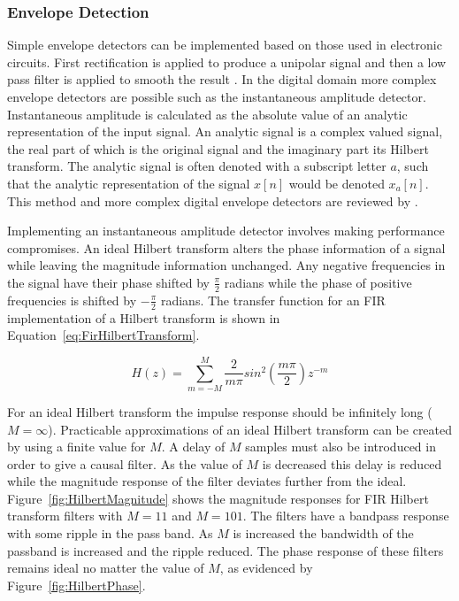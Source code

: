 		\subsubsection*{Envelope Detection}
			Simple envelope detectors can be implemented based on those used in electronic circuits. First
			rectification is applied to produce a unipolar signal and then a low pass filter is applied to
			smooth the result \citep{dutilleux2011modulators}. In the digital domain more complex envelope
			detectors are possible such as the instantaneous amplitude detector. Instantaneous amplitude is
			calculated as the absolute value of an analytic representation of the input signal. An analytic
			signal is a complex valued signal, the real part of which is the original signal and the imaginary
			part its Hilbert transform. The analytic signal is often denoted with a subscript letter $a$, such
			that the analytic representation of the signal $x[n]$ would be denoted $x_{a}[n]$. This method and
			more complex digital envelope detectors are reviewed by \citet{chang2007a}. 

			Implementing an instantaneous amplitude detector involves making performance compromises. An ideal
			Hilbert transform alters the phase information of a signal while leaving the magnitude information
			unchanged. Any negative frequencies in the signal have their phase shifted by $\frac{\pi}{2}$
			radians while the phase of positive frequencies is shifted by $-\frac{\pi}{2}$ radians. The
			transfer function for an FIR implementation of a Hilbert transform is shown in
			Equation~\ref{eq:FirHilbertTransform}.

			\begin{equation}
				H(z) = \sum_{m = -M}^{M} \frac{2}{m\pi} sin^{2} \left( \frac{m\pi}{2} \right) z^{-m}
				\label{eq:FirHilbertTransform}
			\end{equation}

			For an ideal Hilbert transform the impulse response should be infinitely long ($M = \infty$).
			Practicable approximations of an ideal Hilbert transform can be created by using a finite value for
			$M$. A delay of $M$ samples must also be introduced in order to give a causal filter. As the value
			of $M$ is decreased this delay is reduced while the magnitude response of the filter deviates
			further from the ideal. Figure~\ref{fig:HilbertMagnitude} shows the magnitude responses for FIR
			Hilbert transform filters with $M = 11$ and $M = 101$. The filters have a bandpass response with
			some ripple in the pass band. As $M$ is increased the bandwidth of the passband is increased and
			the ripple reduced. The phase response of these filters remains ideal no matter the value of $M$,
			as evidenced by Figure~\ref{fig:HilbertPhase}.

